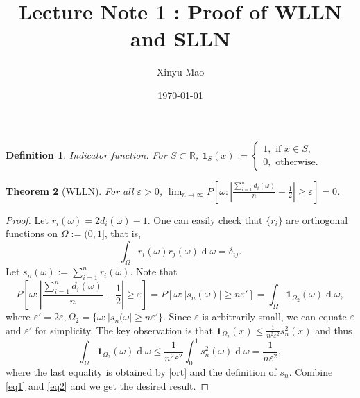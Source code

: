 \documentclass[12pt]{article}
\title{Lecture Note 1 : Proof of WLLN and SLLN}
\author{Xinyu Mao}
\date{\today}
\newtheorem{theorem}{Theorem}
\newtheorem{definition}[theorem]{Definition}
\newcommand\Real{\mathbb{R}}
\newcommand\one{\bm{1}}
\newcommand\eps{\varepsilon}
\DeclareMathOperator{\diff}{d}
\begin{document}
\maketitle

\begin{definition}{Indicator function.}
For $S \subset \Real$,  $\one_S(x) := \begin{cases}
    1, \text{ if $x \in S$}, \\
    0, \text{ otherwise.}
\end{cases}    
$
\end{definition}

\begin{theorem}[WLLN]\label{wlln}
    For all $\eps > 0$, $\lim_{n \to \infty} P[\omega : |\frac{\sum_{i=1}^n d_i(\omega)}{n} - \frac{1}{2}| \geq \eps] = 0$.
\end{theorem}
\begin{proof}
    Let $r_i(\omega) = 2d_i(\omega) - 1$. 
    One can easily check that $\{r_i\}$ are orthogonal functions
    on $\Omega := (0,1]$, that is,
    \begin{equation} \label{ort}
        \int_{\Omega} r_i(\omega)r_j(\omega) \diff \omega = \delta_{ij}.
    \end{equation}
    Let $s_n(\omega) := \sum_{i=1}^n r_i(\omega)$.
    Note that 
    \begin{equation} \label{eq1}
        P[\omega : |\frac{\sum_{i=1}^n d_i(\omega)}{n} - \frac{1}{2}| \geq \eps]
        = P[\omega : |s_n(\omega)| \ge n\eps']  
        = \int_{\Omega} \one_{\Omega_2}(\omega) \diff \omega,
    \end{equation}
    where $\eps' = 2\eps, \Omega_2 = \{\omega : |s_n(\omega| \geq n\eps'\}$.
    Since $\eps$ is arbitrarily small,  we can equate $\eps$ and $\eps'$ for simplicity.
    The key observation is that $\one_{\Omega_2}(x) \leq \frac{1}{n^2\eps^2}s_n^2(x)$ and thus
    \begin{equation} \label{eq2}
        \int_{\Omega} \one_{\Omega_2}(\omega) \diff \omega
        \leq \frac{1}{n^2\eps^2} \int_0^1 s_n^2(\omega) \diff \omega
        = \frac{1}{n\eps^2},
    \end{equation}
    where the last equality is obtained by \cref{ort} and the definition of $s_n$.
    Combine \cref{eq1} and \cref{eq2}
    and we get the desired result.
\end{proof}
\end{document}
